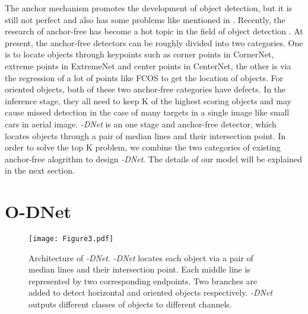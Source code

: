 \documentclass[runningheads]{llncs}
\begin{document}
The anchor mechanism promotes the development of object detection, but it is still not perfect and also has some problems like mentioned in \cite{law2018cornernet,zhou2019bottom,tian2019fcos,zhou2019objects}. Recently, the research of anchor-free has become a hot topic in the field of object detection . At present, the anchor-free detectors can be roughly divided into two categories. One is to locate objects through keypoints such as corner points in CornerNet\cite{law2018cornernet}, extreme points in ExtremeNet\cite{zhou2019bottom} and center points in CenterNet\cite{zhou2019objects}, the other is via the regression of a lot of points like FCOS\cite{tian2019fcos} to get the location of objects. For oriented objects, both of these two anchor-free categories have defects. In the inference stage, they all need to keep K of the highest scoring objects and may cause missed detection in the case of many targets in a single image like small cars in aerial image. \textit{-DNet} is an one stage and anchor-free detector, which locates objects through a pair of median lines and their intersection point. In order to solve the top K problem, we combine the two categories of existing anchor-free alogrithm to design \textit{-DNet}. The details of our model will be explained in the next section.



\section{O-DNet} \label{section:3}

\begin{figure*}[!t]
	\centering
	\texttt{[image: Figure3.pdf]}
\caption{Architecture of \textit{-DNet}. \textit{-DNet} locates each object via a pair of median lines and their intersection point. Each middle line is represented by two corresponding endpoints. Two branches are added to detect horizontal and oriented objects respectively. \textit{-DNet} outputs different classes of objects to different channels.} 
	\label{Figure 3}
\end{figure*}
\end{document}
